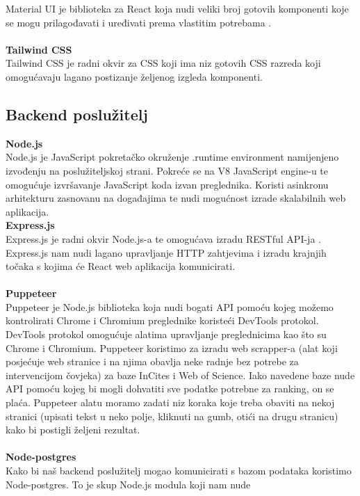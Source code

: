 \documentclass[times, utf8, zavrsni]{fer}
\begin{document}
Material UI je biblioteka za React koja nudi veliki broj gotovih komponenti koje se mogu prilagođavati i uređivati prema vlastitim potrebama .
\\
\\ \textbf{Tailwind CSS}
\\ Tailwind CSS je radni okvir  za CSS  koji ima niz gotovih CSS razreda koji omogućavaju lagano postizanje 
željenog izgleda komponenti.
\\ \subsection{Backend poslužitelj}
\textbf{Node.js} 
\\ Node.js je JavaScript pokretačko okruženje \engl.{runtime environment} namijenjeno izvođenju na poslužiteljskoj strani. Pokreće se na V8 JavaScript engine-u 
te omogućuje izvršavanje JavaScript koda izvan preglednika. Koristi asinkronu arhitekturu zasnovanu na događajima 
te nudi mogućnost izrade skalabilnih web aplikacija.\\\newpage \textbf{Express.js}
\\ Express.js je radni okvir  Node.js-a te omogućava izradu RESTful API-ja . Express.js nam nudi
lagano upravljanje HTTP zahtjevima i izradu krajnjih točaka  s kojima će React web aplikacija komunicirati.
\\ \\ \textbf{Puppeteer}
\\ Puppeteer je Node.js biblioteka koja nudi bogati API pomoću kojeg možemo kontrolirati Chrome i Chromium preglednike koristeći DevTools protokol.
DevTools protokol omogućuje alatima upravljanje preglednicima kao što su Chrome i Chromium. Puppeteer koristimo za izradu web scrapper-a (alat koji posjećuje web stranice i 
na njima obavlja neke radnje bez potrebe za intervencijom čovjeka) za baze InCites i Web of Science. Iako navedene baze nude API pomoću kojeg bi mogli 
dohvatiti sve podatke potrebne za ranking, on se plaća. Puppeteer alatu moramo zadati niz koraka koje treba obaviti na nekoj stranici (upisati tekst u neko polje, kliknuti na gumb, otići na drugu stranicu)
kako bi postigli željeni rezultat.
\\ \\ \textbf{Node-postgres} 
\\ Kako bi naš backend poslužitelj mogao komunicirati s bazom podataka koristimo Node-postgres. To je skup Node.js modula koji nam nude 
\end{document}
